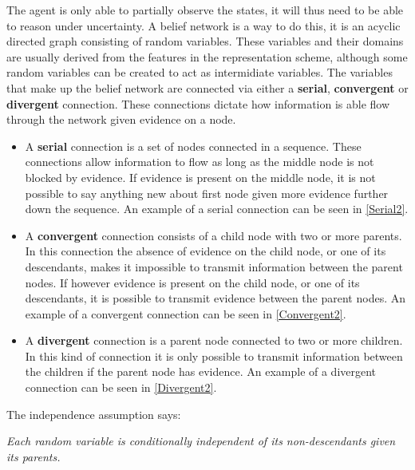 The agent is only able to partially observe the states, it will thus need to be
able to reason under uncertainty. A belief network is a way to do this, it is an acyclic
directed graph consisting of random variables. These variables and their domains
are usually derived from the features in the representation scheme, although
some random variables can be created to act as intermidiate variables. The
variables that make up the belief network are connected via either a
\textbf{serial}, \textbf{convergent} or \textbf{divergent} connection. These
connections dictate how information is able flow through the network given
evidence on a node.
\begin{itemize}
  \item A \textbf{serial} connection is a set of nodes connected in a sequence.
  These connections allow information to flow as long as the middle node is not
  blocked by evidence. If evidence is present on the middle node, it is not
  possible to say anything new about first node given more evidence further down
  the sequence. An example of a serial connection can be seen in
  \autoref{Serial2}.
  \item A \textbf{convergent} connection consists of a child node with two or
  more parents. In this connection the absence of evidence on the child node, or
  one of its descendants, makes it impossible to transmit information between
  the parent nodes. If however evidence is present on the child node, or one of
  its descendants, it is possible to transmit evidence between the
  parent nodes. An example of a convergent connection can be seen in
 \autoref{Convergent2}.
  \item A \textbf{divergent} connection is a parent node connected to two or
  more children. In this kind of connection it is only possible to transmit
  information between the children if the parent node has evidence. An
  example of a divergent connection can be seen in \autoref{Divergent2}.
\end{itemize}

The independence assumption \citep[p.240]{MIBook} says:

\begin{center}
\begin{minipage}{0.8\linewidth}
\textit{Each random variable is conditionally independent of its non-descendants
given its parents.}
\end{minipage}
\end{center}

